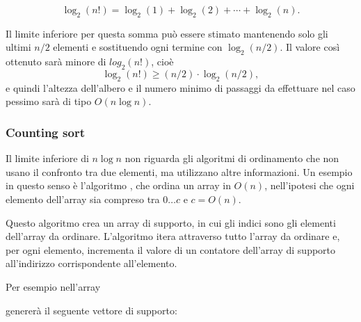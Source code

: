 \[ \log_2(n!) = \log_2(1)+\log_2(2)+\cdots+\log_2(n).\]

Il limite inferiore per questa somma può essere
stimato mantenendo solo gli ultimi $n/2$ elementi e
sostituendo ogni termine con $\log_2(n/2)$.
Il valore così ottenuto sarà minore di $log_2(n!)$, cioè 
\[ \log_2(n!) \ge (n/2) \cdot \log_2(n/2),\]
e quindi l'altezza dell'albero e il numero minimo 
di passaggi da effettuare nel caso pessimo 
sarà di tipo $O(n \log n)$.

\subsubsection{Counting sort}


Il limite inferiore di $n \log n$ non riguarda gli algoritmi
di ordinamento che non usano il confronto tra due elementi,
ma utilizzano altre informazioni.
Un esempio in questo senso è l'algoritmo
, che ordina un array in
$O(n)$, nell'ipotesi che ogni elemento dell'array sia compreso tra
$0 \ldots c$ e $c=O(n)$.

Questo algoritmo crea un array di supporto, in cui gli indici
sono gli elementi dell'array da ordinare.
L'algoritmo itera attraverso tutto l'array da ordinare e,
per ogni elemento, incrementa il valore di un contatore
dell'array di supporto all'indirizzo corrispondente all'elemento.

Per esempio nell'array
\begin{center}
\end{center}
genererà il seguente vettore di supporto:
\begin{center}
\end{center}

